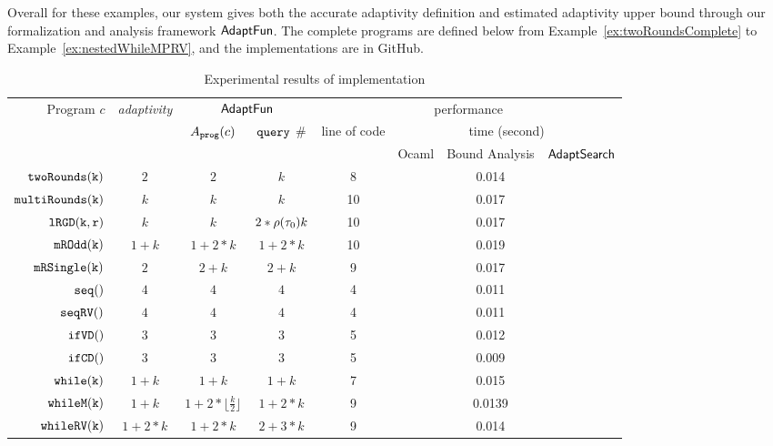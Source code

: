 Overall for these examples, our system gives both the accurate adaptivity definition and estimated
adaptivity upper bound through our formalization and analysis framework $\textsf{AdaptFun}$.
The complete programs are defined below from Example~\ref{ex:twoRoundsComplete} to Example~\ref{ex:nestedWhileMPRV},
and the implementations are in GitHub.
\begin {table}[H]
    \caption{Experimental results of {\THESYSTEM} implementation}
        \label{tb:adapt-imp}
        \begin{center}
        \centering
{\footnotesize
        \begin{tabular}{ r | c | c | c | c | c | c | c  }
        \multirow{3}{*}{Program $c$} & 
        \multirow{3}{*}{\emph{adaptivity}}
         & \multicolumn{2}{c|}{$\textsf{AdaptFun}$}
         & \multicolumn{4}{c}{performance} \\ 
         \cline{3-8}
         & & \multirow{2}{*}{$A_{\mathtt{prog}}(c)$} & \multirow{2}{*}{${\tt query}$ \#} & \multirow{2}{*}{line of code} & \multicolumn{3}{c}{time (second)} \\ 
         \cline{6-8}
         & & & &  & Ocaml & Bound Analysis & $\mathsf{AdaptSearch}$  \\
         \hline \hline
         $  \mathtt{twoRounds(k)}$ & $2$ &  $2$ & $k$ & 8 & & 0.014 \\
         $  \mathtt{multiRounds(k)}$ & $k$ &  $k$ & $k$  &  10 & & 0.017 \\
         $  \mathtt{lRGD(k, r)}$ & $k$ & $k$ & $2 * \rho(\mathtt{\tau}_0) k$  &  10 & & 0.017  \\
         $  \mathtt{mROdd(k)}$ & $1 + k$ &  $1 +2 * k$ & $1 + 2*k$  &  10 & & 0.019  \\
         $  \mathtt{mRSingle(k)}$    & $2$ &  $2 + k$ & $2 + k$  &  9 & & 0.017  \\
         $  \mathtt{seq()}$ & $4$ & $4$ & $4$ & 4 & & 0.011 \\ 
         $  \mathtt{seqRV()}$ & $4$ & $4$ &  $4$ & 4 & & 0.011\\  
         $  \mathtt{ifVD()}$ & $3$ & $3$ &  $3$ & 5 & & 0.012 \\
         $  \mathtt{ifCD()}$ & $3$ & $3$ &   $3$  & 5 & & 0.009   \\
         $  \mathtt{while(k)}$ & $1+k$ &   $1+k$  &  $1+k$ & 7 & & 0.015 \\
         $  \mathtt{whileM(k)}$ & $1 + k$ &  $1 +2 * \lfloor \frac{k}{2} \rfloor$ & $1 + 2 * k$  &  9 & & 0.0139  \\
         $  \mathtt{whileRV(k)}$ & $1 + 2*k$ &  $1 + 2*k$ & $2 + 3 * k$  &  9 & & 0.014  \\

\end{tabular}}
\end{center}
\end{table}
